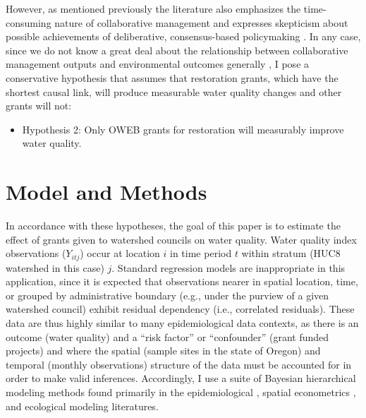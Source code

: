 \documentclass[11pt,a4paper,titlepage]{article}
\begin{document}
However, as mentioned previously the literature also emphasizes the time-consuming nature of collaborative management \parencite[e.g.,][]{margerum2011,ansell2008,imperial2005} and expresses skepticism about possible achievements of deliberative, consensus-based policymaking \parencite{coglianese2003, gunton2003}. In any case, since we do not know a great deal about the relationship between collaborative management outputs and environmental outcomes generally \parencite{carr2012,koontz2006, newig2009}, I pose a conservative hypothesis that assumes that restoration grants, which have the shortest causal link, will produce measurable water quality changes and other grants will not:

\begin{itemize}
\item Hypothesis 2: Only OWEB grants for restoration will measurably improve water quality. 
\end{itemize}


\section*{Model and Methods}

In accordance with these hypotheses, the goal of this paper is to estimate the effect of grants given to watershed councils on water quality. Water quality index observations ($Y_{itj}$) occur at location $i$ in time period $t$ within stratum (HUC8 watershed in this case) $j$. Standard regression models are inappropriate in this application, since it is expected that observations nearer in spatial location, time, or grouped by administrative boundary (e.g., under the purview of a given watershed council) exhibit residual dependency (i.e., correlated residuals). These data are thus highly similar to many epidemiological data contexts, as there is an outcome (water quality) and a “risk factor” or “confounder” (grant funded projects) and where the spatial (sample sites in the state of Oregon) and temporal (monthly observations) structure of the data must be accounted for in order to make valid inferences. Accordingly, I use a suite of Bayesian hierarchical modeling methods found primarily in the epidemiological \parencite{cameletti2013,blangiardo2010,blangiardo2013}, spatial econometrics \parencite{bivand2008,bivand2013,gomez-rubio2014}, and ecological modeling \parencite{cosandey-godin2014, clark2005,clark2006,wikle2003,cressie2009,wikle2010,xu2007,cressie2011} literatures. 
\end{document}
